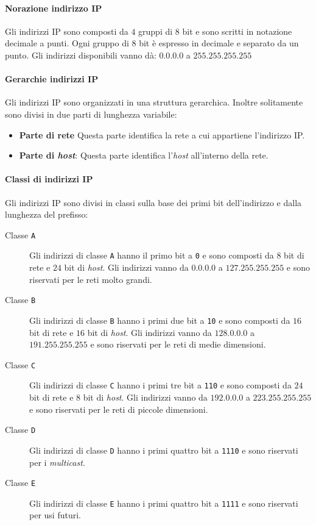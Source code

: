             \paragraph{Norazione indirizzo \Acrshort*{IP}} Gli indirizzi \Acrshort*{IP} sono composti da $4$ gruppi di $8$ bit e sono scritti in notazione decimale a punti. Ogni gruppo di $8$ bit è espresso in decimale e separato da un punto. Gli indirizzi disponibili vanno dà: $0.0.0.0$ a $255.255.255.255$ 
            \paragraph{Gerarchie indirizzi \Acrshort*{IP}} Gli indirizzi \Acrshort*{IP} sono organizzati in una struttura gerarchica. Inoltre solitamente sono divisi in due parti di lunghezza variabile: \begin{itemize}
                \item \textbf{Parte di rete} Questa parte identifica la rete a cui appartiene l'indirizzo \Acrshort*{IP}.
                \item \textbf{Parte di \textit{host}}: Questa parte identifica l'\textit{host} all'interno della rete.
            \end{itemize}
            \paragraph{Classi di indirizzi \Acrshort*{IP}} Gli indirizzi \Acrshort*{IP} sono divisi in classi sulla base dei primi bit dell'indirizzo e dalla lunghezza del prefisso: \begin{description}
                \item[Classe \texttt{A}] Gli indirizzi di classe \texttt{A} hanno il primo bit a \texttt{0} e sono composti da $8$ bit di rete e $24$ bit di \textit{host}. Gli indirizzi vanno da $0.0.0.0$ a $ 127.255.255.255$ e sono riservati per le reti molto grandi.
                \item[Classe \texttt{B}] Gli indirizzi di classe \texttt{B} hanno i primi due bit a \texttt{10} e sono composti da $16$ bit di rete e $16$ bit di \textit{host}. Gli indirizzi vanno da $128.0.0.0$ a $191.255.255.255$ e sono riservati per le reti di medie dimensioni.
                \item[Classe \texttt{C}] Gli indirizzi di classe \texttt{C} hanno i primi tre bit a \texttt{110} e sono composti da $24$ bit di rete e $8$ bit di \textit{host}. Gli indirizzi vanno da $192.0.0.0$ a $223.255.255.255$ e sono riservati per le reti di piccole dimensioni.
                \item[Classe \texttt{D}] Gli indirizzi di classe \texttt{D} hanno i primi quattro bit a \texttt{1110} e sono riservati per i \textit{multicast}.
                \item[Classe \texttt{E}] Gli indirizzi di classe \texttt{E} hanno i primi quattro bit a \texttt{1111} e sono riservati per usi futuri.
            \end{description}
